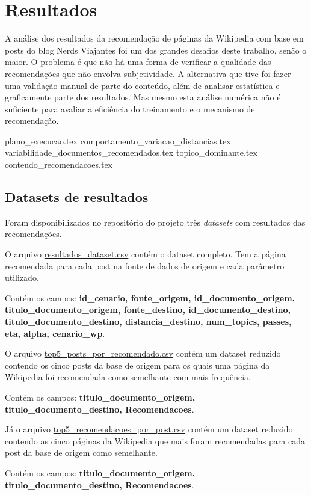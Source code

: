 \section{Resultados}

A análise dos resultados da recomendação de páginas da Wikipedia com base em posts do blog Nerds Viajantes foi um dos grandes desafios deste trabalho,
senão o maior. O problema é que não há uma forma de verificar a qualidade das recomendações que não envolva subjetividade. A alternativa 
que tive foi fazer uma validação manual de parte do conteúdo, além de analisar estatística e graficamente parte dos resultados. Mas mesmo esta 
análise numérica não é suficiente para avaliar a eficiência do treinamento e o mecanismo de recomendação.

{plano_execucao.tex}
{comportamento_variacao_distancias.tex}
{variabilidade_documentos_recomendados.tex}
{topico_dominante.tex}    
{conteudo_recomendacoes.tex}

\subsection{Datasets de resultados}

Foram disponibilizados no repositório do projeto três \textit{datasets} com resultados das recomendações.

O arquivo \href{https://github.com/heldergr/tcc-pucmg-2/tree/main/src/python/docs/relatorio/resultados/resources/resultados_dataset.csv}{resultados\_dataset.csv}
contém o dataset completo. Tem a página recomendada para cada post na fonte de dados de origem e cada parâmetro utilizado.

Contém os campos: \textbf{id\_cenario, fonte\_origem, id\_documento\_origem, titulo\_documento\_origem, fonte\_destino, id\_documento\_destino, 
titulo\_documento\_destino, distancia\_destino, num\_topics, passes, eta, alpha, cenario\_wp}.

O arquivo \href{https://github.com/heldergr/tcc-pucmg-2/tree/main/src/python/docs/relatorio/resultados/resources/top5_posts_por_recomendado.csv}{top5\_posts\_por\_recomendado.csv}
contém um dataset reduzido contendo os cinco posts da base de origem para os quais uma página da Wikipedia foi recomendada como semelhante com
mais frequência.

Contém os campos: \textbf{titulo\_documento\_origem, titulo\_documento\_destino, Recomendacoes}.

Já o arquivo \href{https://github.com/heldergr/tcc-pucmg-2/tree/main/src/python/docs/relatorio/resultados/resources/top5_recomendacoes_por_post.csv}{top5\_recomendacoes\_por\_post.csv}
contém um dataset reduzido contendo as cinco páginas da Wikipedia que mais foram recomendadas para cada post da base de origem como semelhante.

Contém os campos: \textbf{titulo\_documento\_origem, titulo\_documento\_destino, Recomendacoes}.